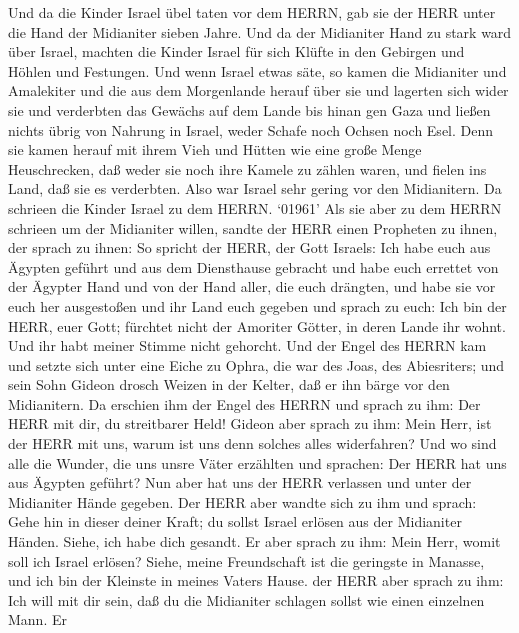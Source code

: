  Und da die Kinder Israel übel taten vor dem HERRN, gab sie
der HERR unter die Hand der Midianiter sieben Jahre.  Und da
der Midianiter Hand zu stark ward über Israel, machten die Kinder Israel
für sich Klüfte in den Gebirgen und Höhlen und Festungen. 
Und wenn Israel etwas säte, so kamen die Midianiter und Amalekiter und
die aus dem Morgenlande herauf über sie  und lagerten sich
wider sie und verderbten das Gewächs auf dem Lande bis hinan gen Gaza
und ließen nichts übrig von Nahrung in Israel, weder Schafe noch Ochsen
noch Esel.  Denn sie kamen herauf mit ihrem Vieh und Hütten
wie eine große Menge Heuschrecken, daß weder sie noch ihre Kamele zu
zählen waren, und fielen ins Land, daß sie es verderbten. 
Also war Israel sehr gering vor den Midianitern. Da schrieen die Kinder
Israel zu dem HERRN.  `01961' Als sie aber zu dem HERRN
schrieen um der Midianiter willen,  sandte der HERR einen
Propheten zu ihnen, der sprach zu ihnen: So spricht der HERR, der Gott
Israels: Ich habe euch aus Ägypten geführt und aus dem Diensthause
gebracht  und habe euch errettet von der Ägypter Hand und
von der Hand aller, die euch drängten, und habe sie vor euch her
ausgestoßen und ihr Land euch gegeben  und sprach zu euch:
Ich bin der HERR, euer Gott; fürchtet nicht der Amoriter Götter, in
deren Lande ihr wohnt. Und ihr habt meiner Stimme nicht gehorcht.
 Und der Engel des HERRN kam und setzte sich unter eine
Eiche zu Ophra, die war des Joas, des Abiesriters; und sein Sohn Gideon
drosch Weizen in der Kelter, daß er ihn bärge vor den Midianitern.
 Da erschien ihm der Engel des HERRN und sprach zu ihm: Der
HERR mit dir, du streitbarer Held!  Gideon aber sprach zu
ihm: Mein Herr, ist der HERR mit uns, warum ist uns denn solches alles
widerfahren? Und wo sind alle die Wunder, die uns unsre Väter erzählten
und sprachen: Der HERR hat uns aus Ägypten geführt? Nun aber hat uns der
HERR verlassen und unter der Midianiter Hände gegeben.  Der
HERR aber wandte sich zu ihm und sprach: Gehe hin in dieser deiner
Kraft; du sollst Israel erlösen aus der Midianiter Händen. Siehe, ich
habe dich gesandt.  Er aber sprach zu ihm: Mein Herr, womit
soll ich Israel erlösen? Siehe, meine Freundschaft ist die geringste in
Manasse, und ich bin der Kleinste in meines Vaters Hause. 
der HERR aber sprach zu ihm: Ich will mit dir sein, daß du die
Midianiter schlagen sollst wie einen einzelnen Mann.  Er
